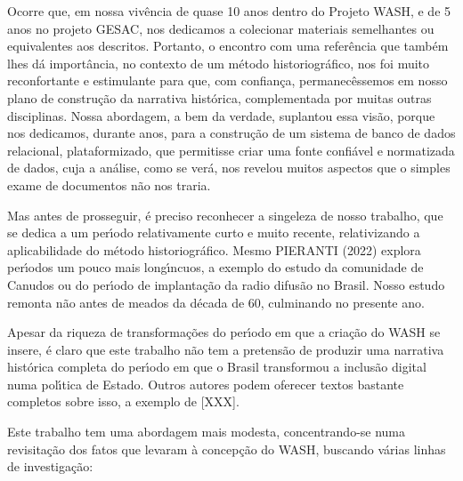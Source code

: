 \documentclass[
12pt,		%
openright,	%
twoside,  %
a4paper,			%
chapter=TITLE,		%
english,			%
french,				%
spanish,			%
brazil				%
]{USPSC-classe/USPSC}
\begin{document}
Ocorre que, em nossa viv\^encia de quase 10 anos dentro do Projeto WASH, e de 5 anos no projeto GESAC, nos dedicamos a colecionar materiais semelhantes ou equivalentes aos descritos. Portanto, o encontro com uma refer\^encia que tamb\'em lhes d\'a import\^ancia, no contexto de um m\'etodo historiogr\'afico, nos foi muito reconfortante e estimulante para que, com confian\c{c}a, permanec\^essemos em nosso plano de constru\c{c}\~ao da narrativa hist\'orica, complementada por muitas outras disciplinas. Nossa abordagem, a bem da verdade, suplantou essa vis\~ao, porque nos dedicamos, durante anos, para a constru\c{c}\~ao de um sistema de banco de dados relacional, plataformizado, que permitisse criar uma fonte confi\'avel e normatizada de dados, cuja a an\'alise, como se ver\'a, nos revelou muitos aspectos que o simples exame de documentos n\~ao nos traria.










Mas antes de prosseguir, \'e preciso reconhecer a singeleza de nosso trabalho, que se dedica a um per\'{\i}odo relativamente curto e muito recente, relativizando a aplicabilidade do m\'etodo historiogr\'afico. Mesmo  PIERANTI (2022) explora per\'{\i}odos um pouco mais long\'{\i}ncuos, a exemplo do estudo da comunidade de Canudos ou do per\'{\i}odo de implanta\c{c}\~ao da radio difus\~ao no Brasil. Nosso estudo remonta n\~ao antes de meados da d\'ecada de 60, culminando no presente ano.










Apesar da riqueza de transforma\c{c}\~oes do per\'{\i}odo em que a cria\c{c}\~ao do WASH se insere, \'e claro que este trabalho n\~ao tem a pretens\~ao de produzir uma narrativa hist\'orica completa do per\'{\i}odo em que o Brasil transformou a inclus\~ao digital numa pol\'{\i}tica de Estado. Outros autores podem oferecer textos bastante completos sobre isso, a exemplo de [XXX].










Este trabalho tem uma abordagem mais modesta, concentrando-se numa revisita\c{c}\~ao dos fatos que levaram \`a concep\c{c}\~ao do WASH, buscando v\'arias linhas de investiga\c{c}\~ao:
\end{document}
